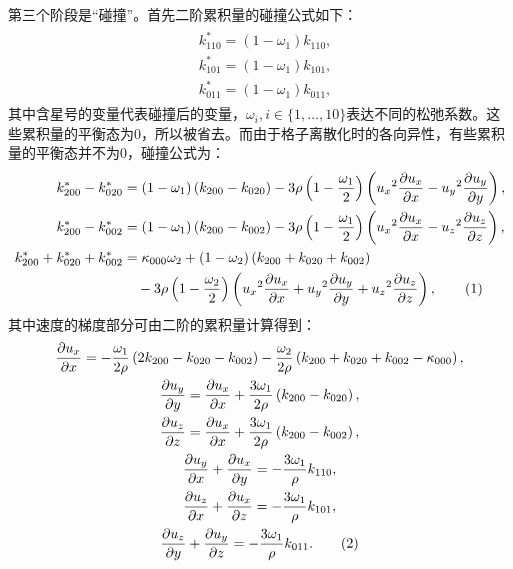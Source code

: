 第三个阶段是“碰撞”。首先二阶累积量的碰撞公式如下：
\begin{align}
    \begin{split}
& k_{110}^{*}=\left(1-\omega_{1}\right) k_{110}, \\
& k_{101}^{*}=\left(1-\omega_{1}\right) k_{101}, \\
& k_{011}^{*}=\left(1-\omega_{1}\right) k_{011} ,
\end{split}
\end{align}
其中含星号的变量代表碰撞后的变量，$\omega_{i}, i \in \{1,\dots,10\}$表达不同的松弛系数。这些累积量的平衡态为0，所以被省去。而由于格子离散化时的各向异性，有些累积量的平衡态并不为0，碰撞公式为：
\begin{align*}
k_{200}^{*}-k_{020}^{*} & =\left(1-\omega_{1}\right)\left(k_{200}-k_{020}\right)-3 \rho\left(1-\frac{\omega_{1}}{2}\right)\left({u_x}^{2} \frac{\partial u_x}{\partial x}-{u_y}^{2} \frac{\partial u_y}{\partial y}\right), \\
k_{200}^{*}-k_{002}^{*} & =\left(1-\omega_{1}\right)\left(k_{200}-k_{002}\right)-3 \rho\left(1-\frac{\omega_{1}}{2}\right)\left({u_x}^{2} \frac{\partial u_x}{\partial x}-{u_z}^{2} \frac{\partial u_z}{\partial z}\right), \\
k_{200}^{*}+k_{020}^{*}+k_{002}^{*} & =\kappa_{000} \omega_{2}+\left(1-\omega_{2}\right)\left(k_{200}+k_{020}+k_{002}\right) \\
&\quad -3 \rho\left(1-\frac{\omega_{2}}{2}\right)\left({u_x}^{2} \frac{\partial u_x}{\partial x}+{u_y}^{2} \frac{\partial u_y}{\partial y}+{u_z}^{2} \frac{\partial u_z}{\partial z}\right) ,
\stepcounter{equation}\tag{\theequation}
\end{align*}
其中速度的梯度部分可由二阶的累积量计算得到：
\begin{gather*}
\frac{\partial u_x}{\partial x} =-\frac{\omega_{1}}{2 \rho}\left(2 k_{200}-k_{020}-k_{002}\right)-\frac{\omega_{2}}{2 \rho}\left(k_{200}+k_{020}+k_{002}-\kappa_{000}\right), \\
\frac{\partial u_y}{\partial y} =\frac{\partial u_x}{\partial x}+\frac{3 \omega_{1}}{2 \rho}\left(k_{200}-k_{020}\right), \\
\frac{\partial u_z}{\partial z} =\frac{\partial u_x}{\partial x}+\frac{3 \omega_{1}}{2 \rho}\left(k_{200}-k_{002}\right), \\
\frac{\partial u_y}{\partial x}+\frac{\partial u_x}{\partial y} =-\frac{3 \omega_{1}}{\rho} k_{110}, \\
\frac{\partial u_z}{\partial x}+\frac{\partial u_x}{\partial z} =-\frac{3 \omega_{1}}{\rho} k_{101}, \\
\frac{\partial u_z}{\partial y}+\frac{\partial u_y}{\partial z} =-\frac{3 \omega_{1}}{\rho} k_{011}.
\stepcounter{equation}\tag{\theequation}
\end{gather*}
